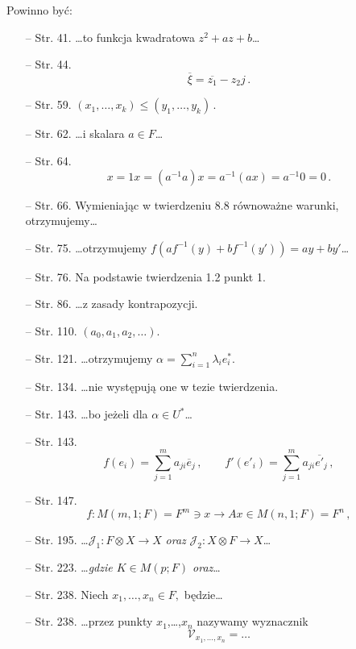 \documentclass[a4paper,11pt]{article}
\begin{document}
\vspace{\spaceTwo}


Powinno być:
\begin{itemize}
\item[--] Str. 41. \ldots to funkcja kwadratowa $z^2+az+b$\ldots
\item[--] Str. 44.
  $$\overline{ \xi } = \overline{ z_{ 1 } } - z_{ 2 } j \, .$$
\item[--] Str. 59.
  $( x_{ 1 }, \ldots, x_{ k } ) \leq (y_{ 1 }, \ldots, y_{ k } ) \, .$
\item[--] Str. 62. \ldots i skalara $a \in F$\ldots
\item[--] Str. 64.
  $$x = 1 x = ( a^{ -1 } a ) x = a^{ -1 }( a x ) = a^{ -1 } 0 = 0 \,
  .$$
\item[--] Str. 66. Wymieniając w twierdzeniu 8.8 równoważne warunki,
  otrzymujemy\ldots
\item[--] Str. 75. \ldots otrzymujemy
  $f( a f^{ -1 }( y ) + b f^{ -1 } ( y' ) ) = a y + b y'$\ldots
\item[--] Str. 76. Na podstawie twierdzenia 1.2 punkt 1.
\item[--] Str. 86. \ldots z zasady kontrapozycji.
\item[--] Str. 110. $( a_{ 0 }, a_{ 1 }, a_{ 2 }, \ldots )$.
\item[--] Str. 121. \ldots otrzymujemy
  $\alpha = \sum_{ i = 1 }^{ n } \lambda_{ i } e^{ * }_{ i } .$
\item[--] Str. 134. \ldots nie występują one w tezie twierdzenia.
\item[--] Str. 143. \ldots bo jeżeli dla $\alpha \in U^{ * }$\ldots
\item[--] Str. 143.
  $$f( e_{ i } ) = \sum_{ j = 1 }^{ m } a_{ j i } \overline{ { e } }_{
    j } \, , \qquad f'( e'_{ i } ) = \sum_{ j = 1 }^{ m } a_{ j i } \overline{
    { e }' }_{ j } \, ,$$
\item[--] Str. 147.
  $$f : M( m, 1; F ) = F^{ m } \ni x \longrightarrow A x \in M( n, 1 ;
  F ) = F^{ n } \, ,$$
\item[--] Str. 195.
  \ldots$\mathcal{ J }_{ 1 } : F \otimes X \rightarrow X$ \emph{oraz}
  $\mathcal{ J }_{ 2 } : X \otimes F \rightarrow X$\ldots
\item[--] Str. 223. \ldots\emph{gdzie $K \in M( p; F )$ oraz}\ldots
\item[--] Str. 238. Niech $x_{ 1 }, \ldots, x_{ n } \in F ,$ będzie\ldots
\item[--] Str. 238. \ldots przez punkty $x_{ 1 }$,\ldots,$x_{ n }$ nazywamy
  wyznacznik
$$\mathcal{ V }_{ x_{ 1 }, \ldots, x_{ n } } = \ldots$$

\end{itemize}
\end{document}
